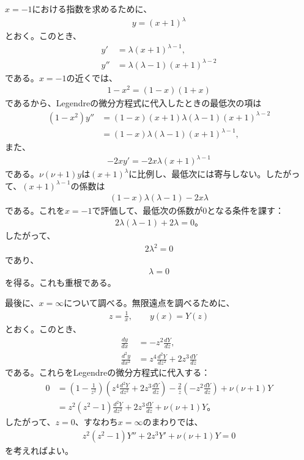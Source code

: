\documentclass[platex,dvipdfmx,a4paper]{jsarticle}
\newcommand{\bbn}[2]{\frac{d #1}{d #2}}
\newcommand{\bbbn}[2]{\frac{d^2 #1}{d #2^2}}
\begin{document}
  $x=-1$における指数を求めるために、
  \begin{align*}
    y=(x+1)^\lambda
  \end{align*}
  とおく。このとき、
  \begin{align*}
    y'&=\lambda(x+1)^{\lambda-1},\\
    y''&=\lambda(\lambda-1)(x+1)^{\lambda-2}
  \end{align*}
  である。$x=-1$の近くでは、
  \begin{align*}
    1-x^2=(1-x)(1+x)
  \end{align*}
  であるから、Legendreの微分方程式に代入したときの最低次の項は
  \begin{align*}
    (1-x^2)y''
    &=(1-x)(x+1)\lambda(\lambda-1)(x+1)^{\lambda-2} \\
    &=(1-x)\lambda(\lambda-1)(x+1)^{\lambda-1},
  \end{align*}
  また、
  \begin{align*}
    -2xy'=-2x\lambda(x+1)^{\lambda-1}
  \end{align*}
  である。$\nu(\nu+1)y$は$(x+1)^\lambda$に比例し、最低次には寄与しない。したがって、$(x+1)^{\lambda-1}$の係数は
  \begin{align*}
    (1-x)\lambda(\lambda-1)-2x\lambda
  \end{align*}
  である。これを$x=-1$で評価して、最低次の係数が$0$となる条件を課す：
  \begin{align*}
    2\lambda(\lambda-1)+2\lambda=0。
  \end{align*}
  したがって、
  \begin{align*}
    2\lambda^2=0
  \end{align*}
  であり、
  \begin{align*}
    \lambda=0
  \end{align*}
  を得る。これも重根である。
  
  最後に、$x=\infty$について調べる。無限遠点を調べるために、
  \begin{align*}
    z=\frac{1}{x},\qquad y(x)=Y(z)
  \end{align*}
  とおく。このとき、
  \begin{align*}
    \bbn{y}{x}
    &=-z^2\bbn{Y}{z},\\
    \bbbn{y}{x}
    &=z^4\bbbn{Y}{z}+2z^3\bbn{Y}{z}
  \end{align*}
  である。これらをLegendreの微分方程式に代入する：
  \begin{align*}
    0
    &=
    \left(1-\frac{1}{z^2}\right)
    \left(z^4\bbbn{Y}{z}+2z^3\bbn{Y}{z}\right)
    -\frac{2}{z}\left(-z^2\bbn{Y}{z}\right)
    +\nu(\nu+1)Y \\
    &=
    z^2(z^2-1)\bbbn{Y}{z}+2z^3\bbn{Y}{z}+\nu(\nu+1)Y。
  \end{align*}
  したがって、$z=0$、すなわち$x=\infty$のまわりでは、
  \begin{align*}
    z^2(z^2-1)Y''+2z^3Y'+\nu(\nu+1)Y=0
  \end{align*}
  を考えればよい。
  
\end{document}
